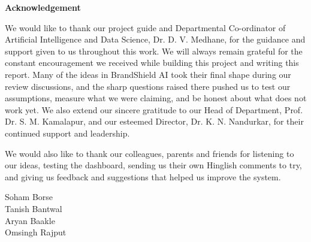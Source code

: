 \begin{center}
\bfseries \fontsize{24}{12} \selectfont Acknowledgement
\end{center}
\vspace*{1\baselineskip}
\hspace*{0.5in}We would like to thank our project guide and Departmental Co-ordinator of Artificial Intelligence and Data Science, Dr. D. V. Medhane, for the guidance and support given to us throughout this work. We will always remain grateful for the constant encouragement we received while building this project and writing this report. Many of the ideas in BrandShield AI took their final shape during our review discussions, and the sharp questions raised there pushed us to test our assumptions, measure what we were claiming, and be honest about what does not work yet. We also extend our sincere gratitude to our Head of Department, Prof. Dr. S. M. Kamalapur, and our esteemed Director, Dr. K. N. Nandurkar, for their continued support and leadership.

\hspace*{0.5in}We would also like to thank our colleagues, parents and friends for listening to our ideas, testing the dashboard, sending us their own Hinglish comments to try, and giving us feedback and suggestions that helped us improve the system.

\vspace*{3\baselineskip}
\begin{flushright}
Soham Borse \\
Tanish Bantwal \\
Aryan Baakle \\
Omsingh Rajput \\
\end{flushright}
